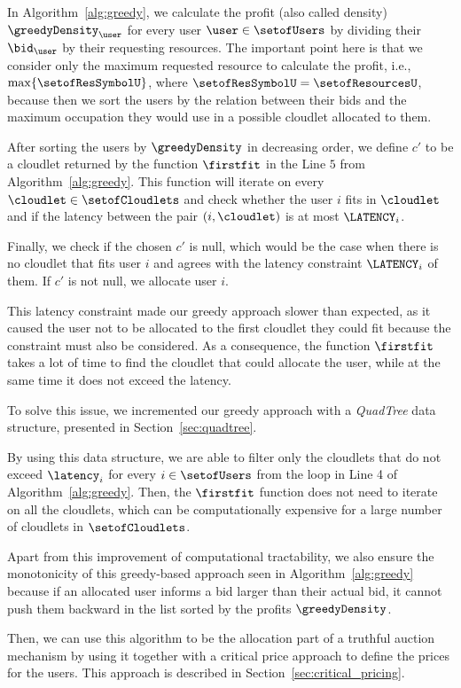 \documentclass[English]{ic-tese-v3}
\begin{document}
In Algorithm~\ref{alg:greedy}, we calculate the profit (also called density) $\greedyDensity_{\user}$ for every user $\user \in \setofUsers$ by dividing their $\bid_{\user}$ by their requesting resources. The important point here is that we consider only the maximum requested resource to calculate the profit, i.e., $\max\{\setofResSymbolU\}$, where $\setofResSymbolU = \setofResourcesU$, because then we sort the users by the relation between their bids and the maximum occupation they would use in a possible cloudlet allocated to them.

After sorting the users by $\greedyDensity$ in decreasing order, we define $c'$ to be a cloudlet returned by the function $\firstfit$ in the Line $5$ from Algorithm~\ref{alg:greedy}. This function will iterate on every $\cloudlet \in \setofCloudlets$ and check whether the user $i$ fits in $\cloudlet$ and if the latency between the pair $(i, \cloudlet)$ is at most $\LATENCY_i$.

Finally, we check if the chosen $c'$ is null, which would be the case when there is no cloudlet that fits user $i$ and agrees with the latency constraint $\LATENCY_i$ of them. If $c'$ is not null, we allocate user $i$.

This latency constraint made our greedy approach slower than expected, as it caused the user not to be allocated to the first cloudlet they could fit because the constraint must also be considered. As a consequence, the function $\firstfit$ takes a lot of time to find the cloudlet that could allocate the user, while at the same time it does not exceed the latency.

To solve this issue, we incremented our greedy approach with a \emph{QuadTree} data structure, presented in Section~\ref{sec:quadtree}.

By using this data structure, we are able to filter only the cloudlets that do not exceed $\latency_i$ for every $i \in \setofUsers$ from the loop in Line 4 of Algorithm~\ref{alg:greedy}. Then, the $\firstfit$ function does not need to iterate on all the cloudlets, which can be computationally expensive for a large number of cloudlets in $\setofCloudlets$.

Apart from this improvement of computational tractability, we also ensure the monotonicity of this greedy-based approach seen in Algorithm~\ref{alg:greedy} because if an allocated user informs a bid larger than their actual bid, it cannot push them backward in the list sorted by the profits $\greedyDensity$.

Then, we can use this algorithm to be the allocation part of a truthful auction mechanism by using it together with a critical price approach to define the prices for the users. This approach is described in Section~\ref{sec:critical_pricing}.
\end{document}
